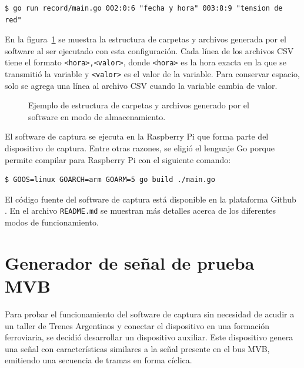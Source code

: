\begin{lstlisting}
$ go run record/main.go 002:0:6 "fecha y hora" 003:8:9 "tension de red"
\end{lstlisting}

\pagebreak

En la figura~\ref{fig:carpetas} se muestra la estructura de carpetas y archivos generada por el software al ser ejecutado con esta configuración.
Cada línea de los archivos CSV tiene el formato \texttt{<hora>,\allowbreak <valor>}, donde \texttt{<hora>} es la hora exacta en la que se transmitió la variable y \texttt{<valor>} es el valor de la variable.
Para conservar espacio, solo se agrega una línea al archivo CSV cuando la variable cambia de valor.

\begin{figure}[htbp]
	\centering
    {
        \renewcommand{\baselinestretch}{0.9}
        \ttfamily
        \fontsize{9pt}{9pt}\selectfont
        
    }
	\caption{Ejemplo de estructura de carpetas y archivos generado por el software en modo de almacenamiento.}
    \label{fig:carpetas}
\end{figure}
\renewcommand{\baselinestretch}{1.0}

El software de captura se ejecuta en la Raspberry Pi que forma parte del dispositivo de captura.
Entre otras razones, se eligió el lenguaje Go porque permite compilar para Raspberry Pi con el siguiente comando:

\begin{lstlisting}
$ GOOS=linux GOARCH=arm GOARM=5 go build ./main.go
\end{lstlisting}

El código fuente del software de captura está disponible en la plataforma Github \cite{mvbparse-go}.
En el archivo \texttt{README.md} se muestran más detalles acerca de los diferentes modos de funcionamiento.

\section{Generador de señal de prueba MVB}
\label{sec:generador}

Para probar el funcionamiento del software de captura sin necesidad de acudir a un taller de Trenes Argentinos y conectar el dispositivo en una formación ferroviaria, se decidió desarrollar un dispositivo auxiliar. Este dispositivo genera una señal con características similares a la señal presente en el bus MVB, emitiendo una secuencia de tramas en forma cíclica.

